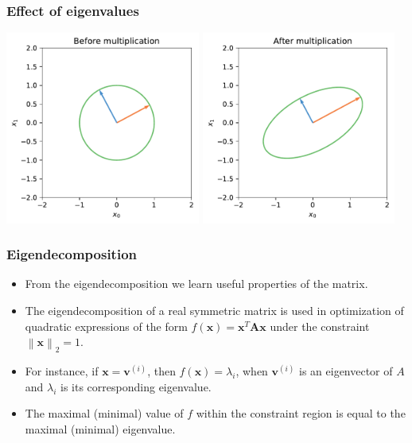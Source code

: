 \documentclass[notes]{beamer}          %
\newcommand{\vect}[1]{\bm{#1}}
\newcommand{\norm}[1]{\left\lVert#1\right\rVert}
\providecommand{\norm}[1]{\lVert#1\rVert}
\begin{document}
\begin{frame}
\frametitle{Effect of eigenvalues}

\begin{center}
\includegraphics[width=0.48\textwidth]{../figures/week_1/unit_circle_before.pdf}
\hfill
\includegraphics[width=0.48\textwidth]{../figures/week_1/unit_circle_after.pdf}
\end{center}

\end{frame}


\begin{frame}
\frametitle{Eigendecomposition}
    \begin{itemize}
        \item From the eigendecomposition we learn useful properties of the matrix.
        \item The eigendecomposition of a real symmetric matrix is used in optimization of quadratic expressions of the form $f(\vect{x}) = \vect{x}^T \vect{A} \vect{x}$ under the constraint $\norm{\vect{x}}_2 = 1$.
        \item For instance, if $\vect{x}=\vect{v}^{(i)}$, then $f(\vect{x}) = \lambda_i$, when $\vect{v}^{(i)}$ is an eigenvector of $A$ and $\lambda_i$ is its corresponding eigenvalue.
        \item The maximal (minimal) value of $f$ within the constraint region is equal to the maximal (minimal) eigenvalue.
    \end{itemize}

\end{frame}
\fi
\end{document}
